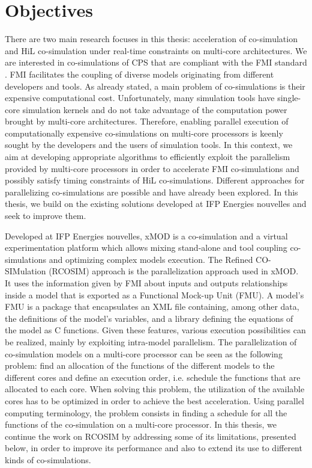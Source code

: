 \section{Objectives}

There are two main research focuses in this thesis: acceleration of co-simulation and HiL co-simulation under real-time constraints on multi-core architectures. We are interested in co-simulations of CPS that are compliant with the FMI standard \cite{fmi:2014}. FMI facilitates the coupling of diverse models originating from different developers and tools. As already stated, a main problem of co-simulations is their expensive computational cost. Unfortunately, many simulation tools have single-core simulation kernels and do not take advantage of the computation power brought by multi-core architectures. Therefore, enabling parallel execution of computationally expensive co-simulations on multi-core processors is keenly sought by the developers and the users of simulation tools. In this context, we aim at developing appropriate algorithms to efficiently exploit the parallelism provided by multi-core processors in order to accelerate FMI co-simulations and possibly satisfy timing constraints of HiL co-simulations. Different approaches for parallelizing co-simulations are possible and have already been explored. In this thesis, we build on the existing solutions developed at IFP Energies nouvelles and seek to improve them. 

Developed at IFP Energies nouvelles, xMOD is a co-simulation and a virtual experimentation platform which allows mixing stand-alone and tool coupling co-simulations and optimizing complex models execution. The Refined CO-SIMulation (RCOSIM) approach \cite{benkhaled:2014} is the parallelization approach used in xMOD. It uses the information given by FMI about inputs and outputs relationships inside a model that is exported as a Functional Mock-up Unit (FMU). A model's FMU is a package that encapsulates an XML file containing, among other data, the definitions of the model's variables, and a library defining the equations of the model as C functions. Given these features, various execution possibilities can be realized, mainly by exploiting intra-model parallelism. The parallelization of co-simulation models on a multi-core processor can be seen as the following problem: find an allocation of the functions of the different models to the different cores and define an execution order, i.e. schedule the functions that are allocated to each core. When solving this problem, the utilization of the available cores has to be optimized in order to achieve the best acceleration. Using parallel computing terminology, the problem consists in finding a schedule for all the functions of the co-simulation on a multi-core processor. In this thesis, we continue the work on RCOSIM by addressing some of its limitations, presented below, in order to improve its performance and also to extend its use to different kinds of co-simulations.


